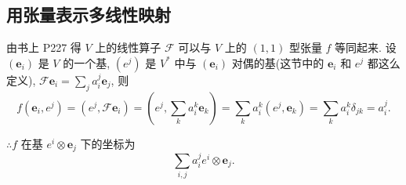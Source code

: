 \documentclass[color=black,device=normal,lang=cn,mode=geye]{elegantnote}
\begin{document}
\subsection{用张量表示多线性映射}
由书上 P227 得 $V$ 上的线性算子 $\mathcal{F}$ 可以与 $V$ 上的 $(1,1)$ 型张量 $f$ 等同起来. 设 $(\boldsymbol{e}_i)$ 是 $V$ 的一个基, $(e^j)$ 是 $V^*$ 中与 $(\boldsymbol{e}_i)$ 对偶的基(这节中的 $\boldsymbol{e}_i$ 和 $e^j$ 都这么定义), $\mathcal{F}\boldsymbol{e}_i=\sum\limits_ja_i^j\boldsymbol{e}_j$, 则
\[f(\boldsymbol{e}_i,e^j)=(e^j,\mathcal{F}\boldsymbol{e}_i)=\left(e^j,\sum\limits_ka_i^k\boldsymbol{e}_k\right)=\sum\limits_ka_i^k(e^j,\boldsymbol{e}_k)=\sum\limits_ka_i^k\delta_{jk}=a_i^j.\]

$\therefore f$ 在基 $e^i\otimes\boldsymbol{e}_j$ 下的坐标为
\[\sum\limits_{i,j}a_i^je^i\otimes\boldsymbol{e}_j.\]
\end{document}
